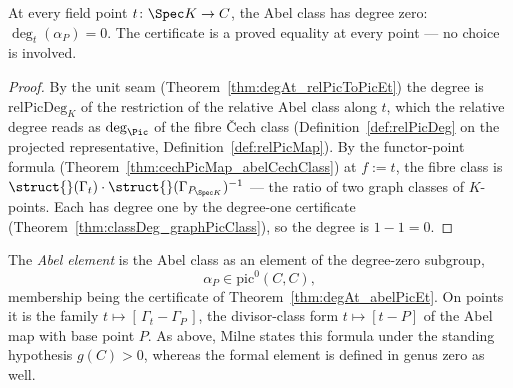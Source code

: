 \begin{theorem}
  \label{thm:degAt_abelPicEt}
  \leanok
  At every field point \(t \colon \Spec K \to C\), the Abel class has degree zero:
  \(\deg_t(\alpha_P) = 0\). The certificate is a proved equality at every point — no
  choice is involved.
\end{theorem}
\begin{proof}
  \leanok
  By the unit seam (Theorem~\ref{thm:degAt_relPicToPicEt}) the degree is
  \(\mathrm{relPicDeg}_K\) of the restriction of the relative Abel class along \(t\), which
  the relative degree reads as \(\deg_{\Pic}\) of the fibre \v Cech class
  (Definition~\ref{def:relPicDeg} on the projected representative,
  Definition~\ref{def:relPicMap}). By the functor-point formula
  (Theorem~\ref{thm:cechPicMap_abelCechClass}) at \(f := t\), the fibre class is
  \(\struct{}(\Gamma_t) \cdot \struct{}(\Gamma_{P_{\Spec K}})^{-1}\) — the ratio of two
  graph classes of \(K\)-points. Each has degree one by the degree-one certificate
  (Theorem~\ref{thm:classDeg_graphPicClass}), so the degree is \(1 - 1 = 0\).
\end{proof}

\begin{definition}
  \label{def:abelElement}
  \leanok
  The \emph{Abel element} is the Abel class as an element of the degree-zero subgroup,
  \[
    \alpha_P \in \mathrm{pic}^0(C, C),
  \]
  membership being the certificate of Theorem~\ref{thm:degAt_abelPicEt}. On points it is the
  family \(t \mapsto [\,\Gamma_t - \Gamma_P\,]\), the divisor-class form \(t \mapsto [t - P]\)
  of the Abel map with base point \(P\). As above, Milne states this formula under the
  standing hypothesis \(g(C)>0\), whereas the formal element is defined in genus zero as
  well.
\end{definition}

